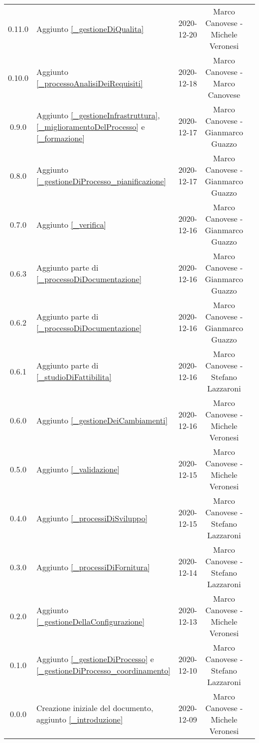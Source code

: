 \begin{center}
\begin{longtable}{|c|p{5cm}|c|c|c|}
		0.11.0 & Aggiunto \ref{_gestioneDiQualita} & 2020-12-20 & Marco Canovese - Michele Veronesi \\
		0.10.0 & Aggiunto \ref{_processoAnalisiDeiRequisiti} & 2020-12-18 & Marco Canovese - Marco Canovese  \\
		0.9.0 & Aggiunto \ref{_gestioneInfrastruttura}, \ref{_miglioramentoDelProcesso} e \ref{_formazione} & 2020-12-17 & Marco Canovese - Gianmarco Guazzo  \\
		0.8.0 & Aggiunto \ref{_gestioneDiProcesso_pianificazione} & 2020-12-17 & Marco Canovese - Gianmarco Guazzo \\
		0.7.0 & Aggiunto \ref{_verifica} & 2020-12-16 & Marco Canovese - Gianmarco Guazzo \\
		0.6.3 & Aggiunto parte di \ref{_processoDiDocumentazione} & 2020-12-16 & Marco Canovese - Gianmarco Guazzo \\
		0.6.2 & Aggiunto parte di \ref{_processoDiDocumentazione} & 2020-12-16 & Marco Canovese - Gianmarco Guazzo \\
		0.6.1 & Aggiunto parte di \ref{_studioDiFattibilita} & 2020-12-16 & Marco Canovese - Stefano Lazzaroni  \\
		0.6.0 & Aggiunto \ref{_gestioneDeiCambiamenti} & 2020-12-16 & Marco Canovese - Michele Veronesi \\
		0.5.0 & Aggiunto \ref{_validazione} & 2020-12-15 & Marco Canovese - Michele Veronesi  \\
		0.4.0 & Aggiunto \ref{_processiDiSviluppo} & 2020-12-15 & Marco Canovese - Stefano Lazzaroni  \\
		0.3.0 & Aggiunto \ref{_processiDiFornitura} & 2020-12-14 & Marco Canovese - Stefano Lazzaroni \\
		0.2.0 & Aggiunto \ref{_gestioneDellaConfigurazione} & 2020-12-13 & Marco Canovese - Michele Veronesi  \\
		0.1.0 & Aggiunto \ref{_gestioneDiProcesso} e \ref{_gestioneDiProcesso_coordinamento} & 2020-12-10 & Marco Canovese - Stefano Lazzaroni \\
		0.0.0 & Creazione iniziale del documento, aggiunto \ref{_introduzione} & 2020-12-09 & Marco Canovese - Michele Veronesi \\
		
		\hline
	\end{longtable}
\end{center}